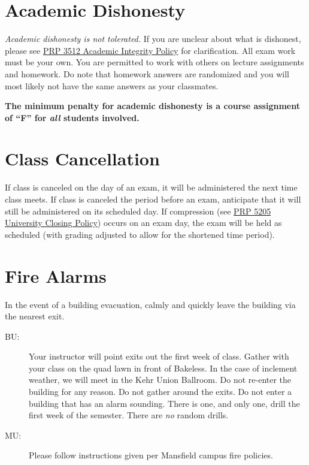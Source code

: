 \documentclass[11pt,letterpaper]{article}
\begin{document}
\section{Academic Dishonesty}
\emph{Academic dishonesty is not tolerated.} If you are unclear about what is
dishonest, please see 
\href{https://www.bloomu.edu/prp-3512-academic-integrity-policy}{PRP 3512
Academic Integrity Policy} for clarification. All exam work must be your own.
You are permitted to work with others on lecture assignments and homework. Do
note that homework answers are randomized and you will most likely not have the
same answers as your classmates.

\begin{mdframed}
	\centering\bfseries The minimum penalty for academic dishonesty is a
	course assignment of ``F'' for \emph{all} students involved.
\end{mdframed}

\section{Class Cancellation}
If class is canceled on the day of an exam, it will be administered the next
time class meets.  If class is canceled the period before an exam, anticipate
that it will still be administered on its scheduled day. If compression
(see \href{https://www.bloomu.edu/documents/prp5205}{PRP 5205 University Closing
Policy})
occurs on an exam day, the exam will be held as scheduled (with
grading adjusted to allow for the shortened time period).

\section{Fire Alarms}
In the event of a building evacuation, calmly and quickly leave the building via
the nearest exit. 
\begin{description}
	\item[BU:] Your instructor will point exits out the first week of class.
		Gather with your class on the quad lawn in front of Bakeless. In
		the case of inclement weather, we will meet in the Kehr Union
		Ballroom. Do not re-enter the building for any reason. Do not
		gather around the exits. Do not enter a building that has an
		alarm sounding. There is one, and only one, drill the first week
		of the semester. There are \emph{no} random drills.
	\item[MU:] Please follow instructions given per Mansfield campus fire
		policies.
\end{description}
\end{document}
